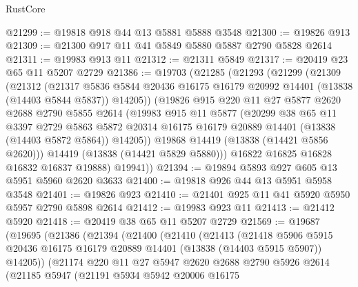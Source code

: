 \begin{lexlean}{RustCore}
\begin{coremodule}
@21299 := @19818 @918 @44 @13 @5881 @5888 @3548
@21300 := @19826 @913
@21309 := @21300 @917 @11 @41 @5849 @5880 @5887 @2790 @5828 @2614
@21311 := @19983 @913 @11
@21312 := @21311 @5849
@21317 := @20419 @23 @65 @11 @5207 @2729
@21386 := @19703
    (@21285
      (@21293
        (@21299
          (@21309
            (@21312
              (@21317
                @5836
                @5844
                @20436
                @16175
                @16179
                @20992
                @14401
                (@13838 (@14403 @5844 @5837))
                @14205))
            (@19826
              @915
              @220
              @11
              @27
              @5877
              @2620
              @2688
              @2790
              @5855
              @2614
              (@19983
                @915
                @11
                @5877
                (@20299
                  @38
                  @65
                  @11
                  @3397
                  @2729
                  @5863
                  @5872
                  @20314
                  @16175
                  @16179
                  @20889
                  @14401
                  (@13838 (@14403 @5872 @5864))
                  @14205))
              @19868
              @14419
              (@13838 (@14421 @5856 @2620)))
            @14419
            (@13838 (@14421 @5829 @5880)))
          @16822
          @16825
          @16828
          @16832
          @16837
          @19888)
        @19941))
@21394 := @19894 @5893 @927 @605 @13 @5951 @5960 @2620 @3633
@21400 := @19818 @926 @44 @13 @5951 @5958 @3548
@21401 := @19826 @923
@21410 := @21401 @925 @11 @41 @5920 @5950 @5957 @2790 @5898 @2614
@21412 := @19983 @923 @11
@21413 := @21412 @5920
@21418 := @20419 @38 @65 @11 @5207 @2729
@21569 := @19687
    (@19695
      (@21386
        (@21394
          (@21400
            (@21410
              (@21413
                (@21418
                  @5906
                  @5915
                  @20436
                  @16175
                  @16179
                  @20889
                  @14401
                  (@13838 (@14403 @5915 @5907))
                  @14205))
              (@21174
                @220
                @11
                @27
                @5947
                @2620
                @2688
                @2790
                @5926
                @2614
                (@21185
                  @5947
                  (@21191
                    @5934
                    @5942
                    @20006
                    @16175

\end{coremodule}
\end{lexlean}
